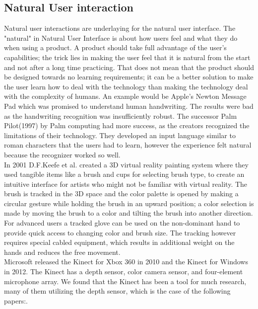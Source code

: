 \subsection{Natural User interaction}
Natural user interactions are underlaying for the natural user interface. The "natural" in Natural User Interface is about how users feel and what they do when using a product. A product should take full advantage of the user's capabilities; the trick lies in making the user feel that it is natural from the start and not after a long time practicing. That does not mean that the product should be designed towards no learning requirements; it can be a better solution to make the user learn how to deal with the technology than making the technology deal with the complexity of humans. An example would be Apple's Newton Message Pad which was promised to understand human handwriting. The results were bad as the handwriting recognition was insufficiently robust. The successor Palm Pilot(1997) by Palm computing had more success, as the creators recognized the limitations of their technology. They developed an input language similar to roman characters that the users had to learn, however the experience felt natural because the recognizer worked so well.\cite{Wigdor:2011}\\ 


In 2001 D.F.Keefe et al. \cite{Keefe:2001} created a 3D virtual reality painting system where they used tangible items like a brush and cups for selecting brush type, to create an intuitive interface for artists who might not be familiar with virtual reality. The brush is tracked in the 3D space and the color palette is opened by making a circular gesture while holding the brush in an upward position; a color selection is made by moving the brush to a color and tilting the brush into another direction.
For advanced users a tracked glove can be used on the non-dominant hand to provide quick access to changing color and brush size.
The tracking however requires special cabled equipment, which results in additional weight on the hands and reduces the free movement. \\

Microsoft released the Kinect for Xbox 360 in 2010\cite{KinectFiction:2010} and the Kinect for Windows in 2012\cite{KinnectPower:2012}. The Kinect has a depth sensor, color camera sensor, and four-element microphone array. We found that the Kinect has been a tool for much research, many of them utilizing the depth sensor, which is the case of the following papers:\cite{Wilson:2010, Aigner:2012, Walter:2014}.\\

